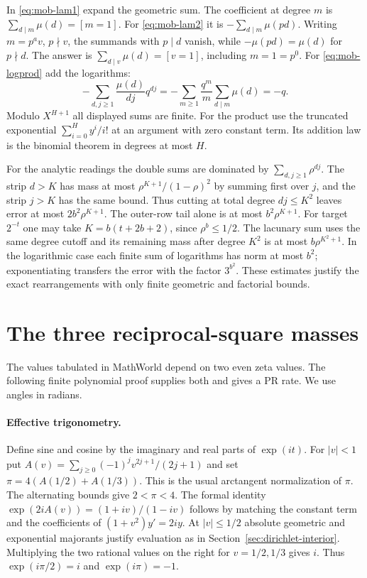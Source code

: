 In \eqref{eq:mob-lam1} expand the geometric sum. The coefficient at
degree $m$ is $\sum_{d\mid m}\mu(d)=[m=1]$.
For \eqref{eq:mob-lam2} it is $-\sum_{d\mid m}\mu(pd)$.
Writing $m=p^a v$, $p\nmid v$, the summands with $p\mid d$ vanish,
while $-\mu(pd)=\mu(d)$ for $p\nmid d$. The answer is
$\sum_{d\mid v}\mu(d)=[v=1]$, including $m=1=p^0$.
For \eqref{eq:mob-logprod} add the logarithms:
\[
 -\sum_{d,j\ge1}\frac{\mu(d)}{dj}q^{dj}
 =-\sum_{m\ge1}\frac{q^m}{m}\sum_{d\mid m}\mu(d)=-q.
\]
Modulo $X^{H+1}$ all displayed sums are finite. For the product use
the truncated exponential $\sum_{i=0}^H y^i/i!$ at an argument
with zero constant term. Its addition law is the binomial theorem in
degrees at most $H$.

For the analytic readings the double sums are dominated by
$\sum_{d,j\ge1}\rho^{dj}$. The strip $d>K$ has mass at most
$\rho^{K+1}/(1-\rho)^2$ by summing first over $j$, and the strip
$j>K$ has the same bound. Thus cutting at total degree $dj\le K^2$
leaves error at most $2b^2\rho^{K+1}$. The outer-row tail alone is
at most $b^2\rho^{K+1}$. For target $2^{-t}$ one may take
$K=b(t+2b+2)$, since $\rho^b\le1/2$.
The lacunary sum uses the same degree cutoff and its remaining mass after
degree $K^2$ is at most $b\rho^{K^2+1}$.
In the logarithmic case each finite sum of logarithms has norm at most
$b^2$; exponentiating transfers the error with the factor $3^{b^2}$.
These estimates justify the exact rearrangements with only finite
geometric and factorial bounds.

\section{The three reciprocal-square masses}
\label{sec:mob-basel}

The values tabulated in MathWorld depend on two even zeta values. The
following finite polynomial proof supplies both and gives a PR rate.
We use angles in radians.

\paragraph{Effective trigonometry.}
Define sine and cosine by the imaginary and real parts of $\exp(it)$.
For $|v|<1$ put
$A(v)=\sum_{j\ge0}(-1)^jv^{2j+1}/(2j+1)$ and set
$\pi=4(A(1/2)+A(1/3))$. This is the usual arctangent normalization of
$\pi$. The alternating bounds give $2<\pi<4$.
The formal identity $\exp(2iA(v))=(1+iv)/(1-iv)$ follows by matching
the constant term and the coefficients of $(1+v^2)y'=2iy$.
At $|v|\le1/2$ absolute geometric and exponential majorants justify
evaluation as in Section~\ref{sec:dirichlet-interior}.
Multiplying the two rational values on the right for $v=1/2,1/3$
gives $i$. Thus $\exp(i\pi/2)=i$ and $\exp(i\pi)=-1$.

